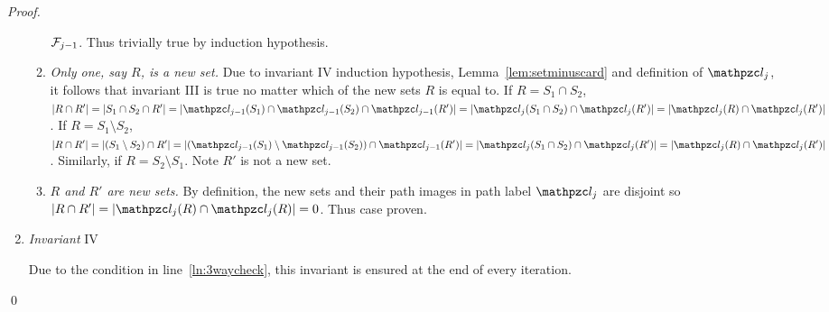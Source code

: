 \documentclass[MS]             %
              {iitmdiss_as}    %
\begin{document}
\begin{proof}
\begin{enumerate}[\xbullet]
\begin{enumerate}[{III}a $|$]
      ${\cal F}_{j-1}$. Thus trivially true by induction hypothesis.
    \item {\em Only one, say $R$, is a new set.} Due to invariant IV
      induction hypothesis, Lemma~\ref{lem:setminuscard} and
      definition of $\cl_j$, it follows that invariant III is true no
      matter which of the new sets $R$ is equal to. If $R = S_1 \cap
      S_2$, $|R \cap R'| = |S_1 \cap S_2 \cap R'| = |\cl_{j-1}(S_1)
      \cap \cl_{j-1}(S_2) \cap \cl_{j-1}(R')| = |\cl_j(S_1 \cap S_2)
      \cap \cl_j(R')| = |\cl_j(R) \cap \cl_j(R')|$.  If $R = S_1
      \setminus S_2$, $|R \cap R'| = |(S_1 \setminus S_2) \cap R'| =
      |(\cl_{j-1}(S_1) \setminus \cl_{j-1}(S_2)) \cap \cl_{j-1}(R')| =
      |\cl_{j}(S_1 \cap S_2) \cap \cl_{j}(R')| = |\cl_{j}(R) \cap
      \cl_{j}(R')|$. Similarly, if $R = S_2 \setminus
      S_1$. Note $R'$ is not a new set.\\

    \item {\em $R$ and $R'$ are new sets.} By definition, the new
      sets and their path images in path label $\cl_j$ are disjoint so
      $|R \cap R'| = |\cl_j(R) \cap \cl_j(R)| = 0$. Thus case proven.
    \end{enumerate}
  \item {\em Invariant} IV
    
    Due to the condition in line~\ref{ln:3waycheck}, this invariant is
    ensured at the end of every iteration.
  \end{enumerate} \qed

\end{proof}
\end{document}
